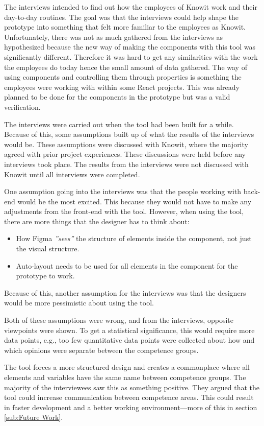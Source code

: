 The interviews intended to find out how the employees of Knowit work and their day-to-day routines. The goal was that the interviews could help shape the prototype into something that felt more familiar to the employees as Knowit. Unfortunately, there was not as much gathered from the interviews as hypothesized because the new way of making the components with this tool was significantly different. Therefore it was hard to get any similarities with the work the employees do today hence the small amount of data gathered. The way of using components and controlling them through properties is something the employees were working with within some React projects. This was already planned to be done for the components in the prototype but was a valid verification. 

The interviews were carried out when the tool had been built for a while. Because of this, some assumptions built up of what the results of the interviews would be. These assumptions were discussed with Knowit, where the majority agreed with prior project experiences. These discussions were held before any interviews took place. The results from the interviews were not discussed with Knowit until all interviews were completed. 

One assumption going into the interviews was that the people working with back-end would be the most excited. This because they would not have to make any adjustments from the front-end with the tool. However, when using the tool, there are more things that the designer has to think about:
\begin{itemize}
  \item How Figma \textit{''sees''} the structure of elements inside the component, not just the visual structure.
  \item Auto-layout needs to be used for all elements in the component for the prototype to work. 
\end{itemize}

Because of this, another assumption for the interviews was that the designers would be more pessimistic about using the tool. 

Both of these assumptions were wrong, and from the interviews, opposite viewpoints were shown. To get a statistical significance, this would require more data points, e.g., too few quantitative data points were collected about how and which opinions were separate between the competence groups.

 The tool forces a more structured design and creates a commonplace where all elements and variables have the same name between competence groups. The majority of the interviewees saw this as something positive. They argued that the tool could increase communication between competence areas. This could result in faster development and a better working environment—more of this in section \ref{sub:Future Work}.

